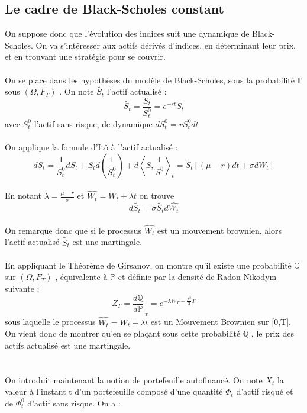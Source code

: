 \documentclass[french,12pt,a4paper]{article}
\begin{document}
\subsection{Le cadre de Black-Scholes constant}

On suppose donc que l'évolution des indices suit une dynamique de Black-Scholes. On va s'intéresser aux actifs dérivés d'indices, en déterminant leur prix, et en trouvant une stratégie pour se couvrir. \\ \\
On se place dans les hypothèses du modèle de Black-Scholes, sous la probabilité $\mathbb{P} $ sous $( \Omega , F_T ) $ . On note $\widetilde{S_{t}}$ l'actif actualisé :
$$\widetilde{S_{t}} = \frac{S_{t}}{S_{t}^0} = e^{-rt}S_{t} $$
avec $S_{t}^0$ l'actif sans risque, de dynamique  $ dS_{t}^0 = rS_{t}^{0}dt $ \\ \\
On applique la formule d'Itô à l'actif actualisé :
$$ d \widetilde{S_{t}} = \frac{1}{S_{t}^0}dS_{t} + S_{t}d \left(\frac{1}{S_{t}^0} \right) + d \left\langle S, \frac{1}{S^0} \right\rangle_{t} = \widetilde{S_{t}} \left[ (\mu - r)dt + \sigma dW_{t} \right] 	$$ \\
En notant  $\lambda = \frac{\mu - r}{\sigma}$ et $ \widehat{W_{t}} = W_{t} + \lambda t $ on trouve
$$ d \widetilde{S_{t}} = \sigma \widetilde{S_{t}} d \widehat{W_{t}} $$ \\
On remarque donc que si le processus $ \widehat{W_{t}} $ est un mouvement brownien, alors l'actif actualisé $ \widetilde{S_t} $ est une martingale. \\ \\
En appliquant le Théorème de Girsanov, on montre qu'il existe une probabilité $ \mathbb{Q} $ sur $ ( \Omega , F_{T} ) $ , équivalente à $ \mathbb{P} $ et définie par la densité de Radon-Nikodym suivante :
$$ Z_{T} = \frac{d\mathbb{Q}}{d\mathbb{P}}_{\mid_{T}} = e^{-\lambda W_{T} - \frac{\lambda^2}{2}T}  	$$
sous laquelle le processus $ \widehat{W_{t}} = W_{t} + \lambda t $  est un Mouvement Brownien sur [0,T]. \\
On vient donc de montrer qu'en se plaçant sous cette probabilité $ \mathbb{Q} $ , le prix des actifs actualisé est une martingale. \\ \\ \\
On introduit maintenant la notion de portefeuille autofinancé. On note $ X_{t} $ la valeur à l'instant t d'un portefeuille composé d'une quantité $ \Phi_t $ d'actif risqué et de $ \Phi_{t}^0 $ d'actif sans risque. On a :
\end{document}
